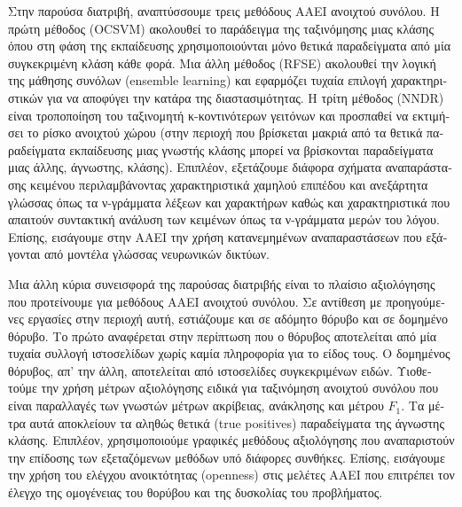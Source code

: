 \documentclass[
    12pt, %
    english, %
    singlespacing, %
    liststotoc, %
    headsepline, %
]{DoctoralThesis} %
\begin{document}
\begin{abstractGR}
\begin{greek}
Στην παρούσα διατριβή, αναπτύσσουμε τρεις μεθόδους ΑΑΕΙ ανοιχτού συνόλου. Η πρώτη μέθοδος (OCSVM) ακολουθεί το παράδειγμα της ταξινόμησης μιας κλάσης όπου στη φάση της εκπαίδευσης χρησιμοποιούνται μόνο θετικά παραδείγματα από μία συγκεκριμένη κλάση κάθε φορά. Μια άλλη μέθοδος (RFSE) ακολουθεί την λογική της μάθησης συνόλων (ensemble learning) και εφαρμόζει τυχαία επιλογή χαρακτηριστικών για να αποφύγει την κατάρα της διαστασιμότητας. Η τρίτη μέθοδος (NNDR) είναι τροποποίηση του ταξινομητή κ-κοντινότερων γειτόνων και προσπαθεί να εκτιμήσει το ρίσκο ανοιχτού χώρου (στην περιοχή που βρίσκεται μακριά από τα θετικά παραδείγματα εκπαίδευσης μιας γνωστής κλάσης μπορεί να βρίσκονται παραδείγματα μιας άλλης, άγνωστης, κλάσης). Επιπλέον, εξετάζουμε διάφορα σχήματα αναπαράστασης κειμένου περιλαμβάνοντας χαρακτηριστικά χαμηλού επιπέδου και ανεξάρτητα γλώσσας όπως τα ν-γράμματα λέξεων και χαρακτήρων καθώς και χαρακτηριστικά που απαιτούν συντακτική ανάλυση των κειμένων όπως τα ν-γράμματα μερών του λόγου. Επίσης, εισάγουμε στην ΑΑΕΙ την χρήση κατανεμημένων αναπαραστάσεων που εξάγονται από μοντέλα γλώσσας νευρωνικών δικτύων. 

Μια άλλη κύρια συνεισφορά της παρούσας διατριβής είναι το πλαίσιο αξιολόγησης που προτείνουμε για μεθόδους ΑΑΕΙ ανοιχτού συνόλου. Σε αντίθεση με προηγούμενες εργασίες στην περιοχή αυτή, εστιάζουμε και σε αδόμητο θόρυβο και σε δομημένο θόρυβο. Το πρώτο αναφέρεται στην περίπτωση που ο θόρυβος αποτελείται από μία τυχαία συλλογή ιστοσελίδων χωρίς καμία πληροφορία για το είδος τους. Ο δομημένος θόρυβος, απ’ την άλλη, αποτελείται από ιστοσελίδες συγκεκριμένων ειδών. Υιοθετούμε την χρήση μέτρων αξιολόγησης ειδικά για ταξινόμηση ανοιχτού συνόλου που είναι παραλλαγές των γνωστών μέτρων ακρίβειας, ανάκλησης και μέτρου $F_1$. Τα μέτρα αυτά αποκλείουν τα αληθώς θετικά (true positives) παραδείγματα της άγνωστης κλάσης. Επιπλέον, χρησιμοποιούμε γραφικές μεθόδους αξιολόγησης που αναπαριστούν την επίδοσης των εξεταζόμενων μεθόδων υπό διάφορες συνθήκες. Επίσης, εισάγουμε την χρήση του ελέγχου ανοικτότητας (openness) στις μελέτες ΑΑΕΙ που επιτρέπει τον έλεγχο της ομογένειας του θορύβου και της δυσκολίας του προβλήματος. 


\end{greek}
\end{abstractGR}
\end{document}
